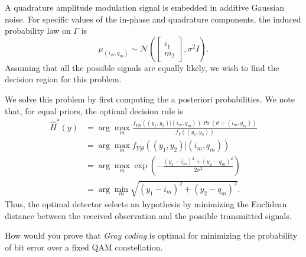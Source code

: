 \begin{example}
A quadrature amplitude modulation signal is embedded in additive Gaussian noise.
For specific values of the in-phase and quadrature components, the induced probability law on $\Gamma$ is
\begin{equation*}
\mu_{(i_m, q_m)} \sim \mathcal{N} \left( \left[ \begin{array}{c} i_1 \\ m_2 \end{array} \right], \sigma^2 I \right) .
\end{equation*}
Assuming that all the possible signals are equally likely, we wish to find the decision region for this problem.

We solve this problem by first computing the a posteriori probabilities.
We note that, for equal priors, the optimal decision rule is
\begin{equation*}
\begin{split}
\hat{H}^*(y)
&= \arg \max_{m} \frac{ f_{Y|\theta} ((y_1, y_2) | (i_m, q_m))
\Pr (\theta = (i_m, q_m)) }{ f_{Y} ((y_1, y_2)) } \\
&= \arg \max_{m} f_{Y|\theta} ((y_1, y_2) | (i_m, q_m)) \\
&= \arg \max_{m} \exp \left( - \frac{(y_1 - i_m)^2 + (y_2 - q_m)^2}{2 \sigma^2} \right) \\
&= \arg \min_{m} \sqrt{(y_1 - i_m)^2 + (y_2 - q_m)^2} .
\end{split}
\end{equation*}
Thus, the optimal detector selects an hypothesis by minimizing the Euclidean distance between the received observation and the possible transmitted signals.
\end{example}

How would you prove that \emph{Gray coding} is optimal for minimizing the probability of bit error over a fixed QAM constellation.

%

